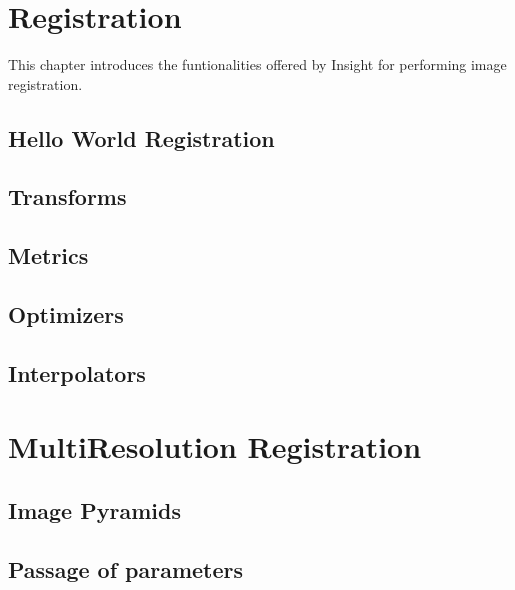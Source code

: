 \chapter{Registration}

This chapter introduces the funtionalities offered by Insight for performing
image registration.

\section{Hello World Registration}
\label{sec:IntroductionImageRegistration}



\section{Transforms}
\label{sec:Transforms}

\section{Metrics}
\label{sec:Metrics}

\section{Optimizers}
\label{sec:Optimizers}

\section{Interpolators}
\label{sec:Interpolators}

\chapter{MultiResolution Registration}
\label{sec:MultiResolutionRegistration}

\section{Image Pyramids}
\label{sec:ImagePyramids}


\section{Passage of parameters}
\label{sec:MultiResolutionParametersPassing}


